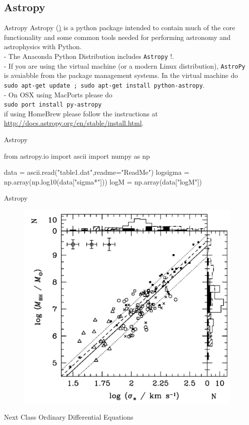 \documentclass[11pt]{beamer}
\begin{document}
\subsection{Astropy}
\begin{frame}[fragile]{Astropy}
 Astropy (\href{http://www.astropy.org/}) is a python package
intended to contain much of the core functionality and some common tools
needed for performing astronomy and astrophysics with Python. \\
- The Anaconda Python Distribution includes {\tt Astropy} !. \\ 
- If you are using the virtual machine (or a modern Linux distribution), {\tt AstroPy}
is avaiabble from the package management systems.  In the virtual machine
 do\\
 {\tt sudo apt-get update ; sudo apt-get install python-astropy}.\\ 
- On OSX using MacPorts please do\\ 
{\tt sudo port install py-astropy}\\
 if using HomeBrew please follow the instructions at
\url{http://docs.astropy.org/en/stable/install.html}.
\end{frame}

\begin{frame}[fragile]{Astropy}
\begin{semiverbatim}
from astropy.io import ascii
import numpy as np

data = ascii.read("table1.dat",readme="ReadMe")  
logsigma = np.array(np.log10(data["sigma*"]))
logM = np.array(data["logM"])
\end{semiverbatim}
\end{frame}

\begin{frame}[fragile]{Astropy}
\begin{figure}
\includegraphics[scale=0.2]{msigma.png}
\end{figure}
\end{frame}

\begin{frame}[fragile]{Next Class}
Ordinary Differential Equations
\end{frame}
\end{document}
